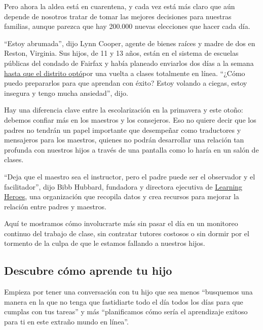 Pero ahora la aldea está en cuarentena, y cada vez está más claro que
aún depende de nosotros tratar de tomar las mejores decisiones para
nuestras familias, aunque parezca que hay 200.000 nuevas elecciones que
hacer cada día.

``Estoy abrumada'', dijo Lynn Cooper, agente de bienes raíces y madre de
dos en Reston, Virginia. Sus hijos, de 11 y 13 años, están en el sistema
de escuelas públicas del condado de Fairfax y había planeado enviarlos
dos días a la semana
\href{https://www.washingtonpost.com/local/education/superintendent-of-loudoun-schools-calls-for-all-virtual-start-to-classes/2020/07/21/9f7c6ae4-cb64-11ea-bc6a-6841b28d9093_story.html}{hasta
que el distrito optó}por una vuelta a clases totalmente en línea.
``¿Cómo puedo prepararlos para que aprendan con éxito? Estoy volando a
ciegas, estoy insegura y tengo mucha ansiedad'', dijo.

Hay una diferencia clave entre la escolarización en la primavera y este
otoño: debemos confiar más en los maestros y los consejeros. Eso no
quiere decir que los padres no tendrán un papel importante que
desempeñar como traductores y mensajeros para los maestros, quienes no
podrán desarrollar una relación tan profunda con nuestros hijos a través
de una pantalla como lo haría en un salón de clases.

``Deja que el maestro sea el instructor, pero el padre puede ser el
observador y el facilitador'', dijo Bibb Hubbard, fundadora y directora
ejecutiva de \href{https://bealearninghero.org/}{Learning Heroes}, una
organización que recopila datos y crea recursos para mejorar la relación
entre padres y maestros.

Aquí te mostramos cómo involucrarte más sin pasar el día en un monitoreo
continuo del trabajo de clase, sin contratar tutores costosos o sin
dormir por el tormento de la culpa de que le estamos fallando a nuestros
hijos.

\hypertarget{descubre-cuxf3mo-aprende-tu-hijo}{%
\subsection{Descubre cómo aprende tu
hijo}\label{descubre-cuxf3mo-aprende-tu-hijo}}

Empieza por tener una conversación con tu hijo que sea menos ``busquemos
una manera en la que no tenga que fastidiarte todo el día todos los días
para que cumplas con tus tareas'' y más ``planificamos cómo sería el
aprendizaje exitoso para ti en este extraño mundo en línea''.


